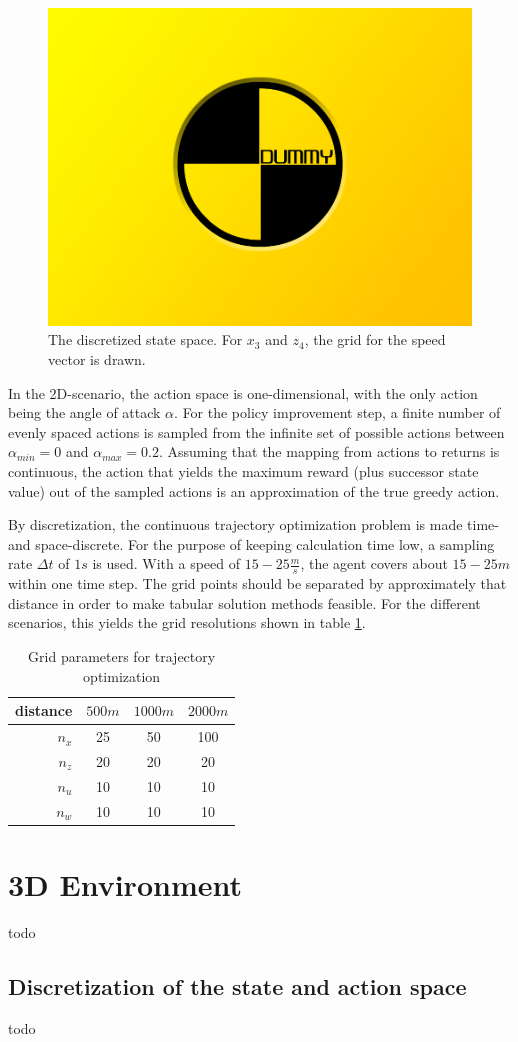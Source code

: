\begin{figure}[h]
	\includegraphics[width=\textwidth]{src/pics/dummy.jpg}
	\caption{The discretized state space. For $x_3$ and $z_4$, the grid for the speed vector is drawn.}
	\label{fig:2d_state_space_discretized}
\end{figure}

In the 2D-scenario, the action space is one-dimensional, with the only action being the angle of attack $\alpha$. For the policy improvement step, a finite number of evenly spaced actions is sampled from the infinite set of possible actions between $\alpha_{min} = 0$ and $\alpha_{max}=0.2$. Assuming that the mapping from actions to returns is continuous, the action that yields the maximum reward (plus successor state value) out of the sampled actions is an approximation of the true greedy action.

By discretization, the continuous trajectory optimization problem is made time- and space-discrete. For the purpose of keeping calculation time low, a sampling rate $\Delta t$ of $1s$ is used. With a speed of $15-25 \frac{m}{s}$, the agent covers about $15-25m$ within one time step. The grid points should be separated by approximately that distance in order to make tabular solution methods feasible. For the different scenarios, this yields the grid resolutions shown in table \ref{tab:grids}.
\begin{table}
	\begin{center}
		\begin{tabular}{r|c c c}
			distance & $500m$ & $1000m$ & $2000m$ \\ \hline
			$n_x$ & 25 & 50 & 100 \\
			$n_z$ & 20 & 20 & 20 \\
			$n_u$ & 10 & 10 & 10 \\
			$n_w$ & 10 & 10 & 10
		\end{tabular}
		\caption{Grid parameters for trajectory optimization}
		\label{tab:grids}
	\end{center}
\end{table}

\section{3D Environment}

todo

\subsection{Discretization of the state and action space}

todo